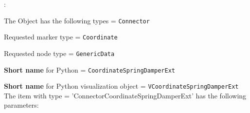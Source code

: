 \noindent {}:
\bi
  \item The Object has the following types = \texttt{Connector}
  \item Requested marker type = \texttt{Coordinate}
  \item Requested node type = \texttt{GenericData}
  \item {\bf Short name} for Python = \texttt{CoordinateSpringDamperExt}
  \item {\bf Short name} for Python visualization object = \texttt{VCoordinateSpringDamperExt}
\ei\vspace{12pt} \noindent 
The item  with type = 'ConnectorCoordinateSpringDamperExt' has the following parameters:
\vspace{-0.5cm}\\
\vspace{-0.5cm}\\
